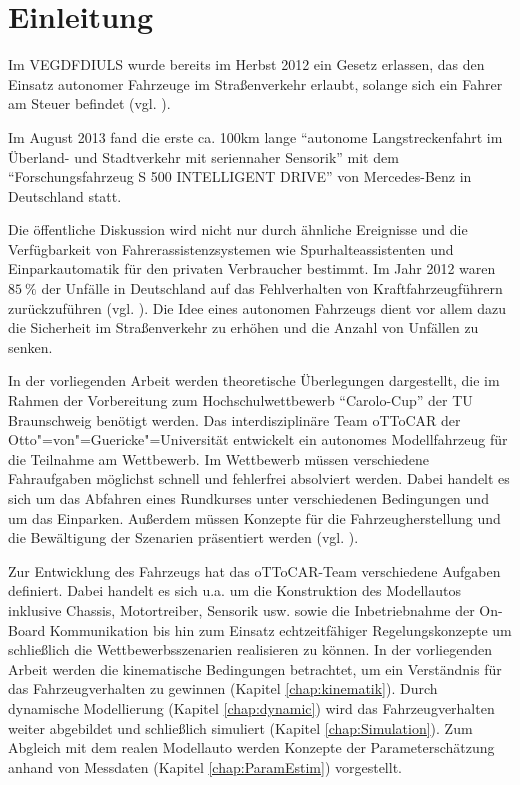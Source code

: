 \chapter{Einleitung}
Im VEGDFDIULS wurde bereits im Herbst 2012 ein Gesetz erlassen, das den Einsatz autonomer Fahrzeuge im Straßenverkehr erlaubt, solange sich ein Fahrer am Steuer befindet (vgl. \cite{Biermann2012}). 

Im August 2013 fand die erste ca. 100km lange "`autonome Langstreckenfahrt im Überland- und Stadtverkehr mit seriennaher Sensorik"' mit dem "`Forschungsfahrzeug S 500 INTELLIGENT DRIVE"' \cite{Daimler2013} von Mercedes-Benz in Deutschland statt. 

Die öffentliche Diskussion wird nicht nur durch ähnliche Ereignisse und die Verfügbarkeit von Fahrerassistenzsystemen wie Spurhalteassistenten und Einparkautomatik für den privaten Verbraucher bestimmt. Im Jahr 2012 waren $\SI{85}{\percent}$ der Unfälle in Deutschland auf das Fehlverhalten von Kraftfahrzeugführern zurückzuführen (vgl. \cite{destatis2013}). Die Idee eines autonomen Fahrzeugs dient vor allem dazu die Sicherheit im Straßenverkehr zu erhöhen und die Anzahl von Unfällen zu senken. 

In der vorliegenden Arbeit werden theoretische Überlegungen dargestellt, die im Rahmen der Vorbereitung zum Hochschulwettbewerb "`Carolo-Cup"' der TU Braunschweig benötigt werden.
Das interdisziplinäre Team oTToCAR der Otto"=von"=Guericke"=Universität entwickelt ein autonomes Modellfahrzeug für die Teilnahme am Wettbewerb.
Im Wettbewerb müssen verschiedene Fahraufgaben möglichst schnell und fehlerfrei absolviert werden. Dabei handelt es sich um das Abfahren eines Rundkurses unter verschiedenen Bedingungen und um das Einparken. Außerdem müssen Konzepte für die Fahrzeugherstellung und die Bewältigung der Szenarien präsentiert werden (vgl. \cite{carolo2014}).

Zur Entwicklung des Fahrzeugs hat das oTToCAR-Team verschiedene Aufgaben definiert. Dabei handelt es sich u.a. um die Konstruktion des Modellautos inklusive Chassis, Motortreiber, Sensorik usw. sowie die Inbetriebnahme der On-Board Kommunikation bis hin zum Einsatz echtzeitfähiger Regelungskonzepte um schließlich die Wettbewerbsszenarien realisieren zu können.
In der vorliegenden Arbeit werden die kinematische Bedingungen betrachtet, um ein Verständnis für das Fahrzeugverhalten zu gewinnen (Kapitel \ref{chap:kinematik}). Durch dynamische Modellierung (Kapitel \ref{chap:dynamic}) wird das Fahrzeugverhalten weiter abgebildet und schließlich simuliert (Kapitel \ref{chap:Simulation}). Zum Abgleich mit dem realen Modellauto werden Konzepte der Parameterschätzung anhand von Messdaten (Kapitel \ref{chap:ParamEstim}) vorgestellt.



